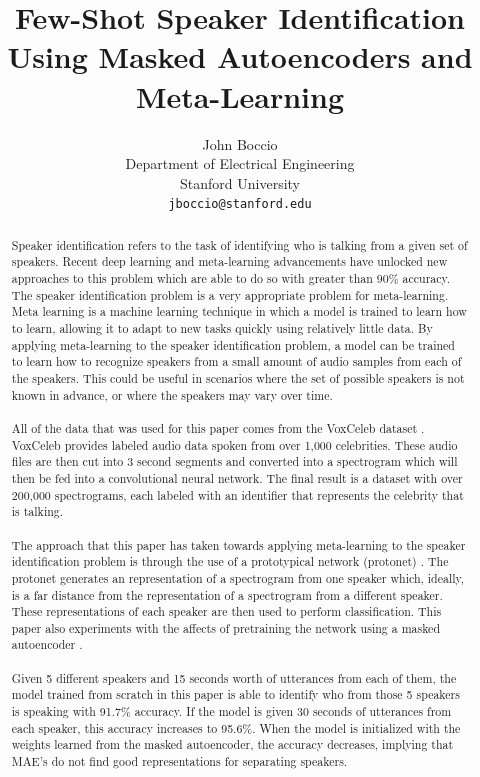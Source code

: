 \documentclass{article}
\title{Few-Shot Speaker Identification Using Masked Autoencoders and Meta-Learning}
\author{
  John Boccio \\
  Department of Electrical Engineering\\
  Stanford University\\
  \texttt{jboccio@stanford.edu} \\
}
\begin{document}
\maketitle

\begin{abstract}
Speaker identification refers to the task of identifying who is talking from a given set of speakers. Recent deep learning 
and meta-learning advancements have unlocked new approaches to this problem which are able to do so with greater than $90\%$ 
accuracy. The speaker identification problem is a very appropriate problem for meta-learning. 
Meta learning is a machine learning technique in which a model is trained to learn how to learn, allowing it to 
adapt to new tasks quickly using relatively little data. By applying meta-learning to the speaker identification problem, 
a model can be trained to learn how to recognize speakers from a small amount of audio samples from each of the speakers. 
This could be useful in scenarios where the set of possible speakers is not known in advance, or where the speakers may vary over time.
\\
\\
All of the data that was used for this paper comes from the VoxCeleb dataset \cite{DBLP:journals/corr/NagraniCZ17}. VoxCeleb
provides labeled audio data spoken from over 1,000 celebrities. These audio files are then cut into 3 second segments and 
converted into a spectrogram which will then be fed into a convolutional neural network. The final
result is a dataset with over 200,000 spectrograms, each labeled with an identifier that represents the celebrity that is talking.
\\
\\
The approach that this paper has taken towards applying meta-learning to the speaker identification problem is through the 
use of a prototypical network (protonet) \cite{DBLP:journals/corr/SnellSZ17}. The protonet generates an representation of a
spectrogram from one speaker which, ideally, is a far distance from the representation of a spectrogram from a different
speaker. These representations of each speaker are then used to perform classification. This paper also experiments with 
the affects of pretraining the network using a masked autoencoder \cite{DBLP:journals/corr/abs-2111-06377}.
\\
\\
Given 5 different speakers and 15 seconds worth of utterances from each of them, the model trained from scratch in this paper 
is able to identify who from those 5 speakers is speaking with 91.7\% accuracy. If the model is given 30 seconds of utterances
from each speaker, this accuracy increases to 95.6\%. When the model is initialized with the weights learned from the 
masked autoencoder, the accuracy decreases, implying that MAE's do not find good representations for separating speakers.

\end{abstract}
\end{document}
